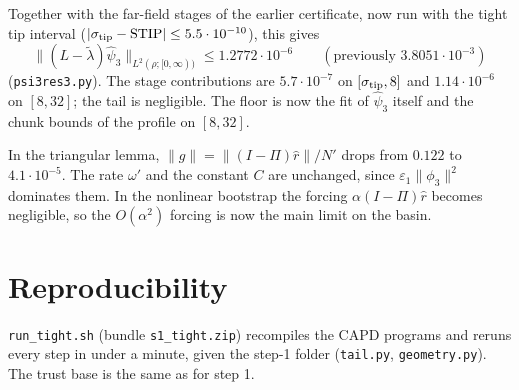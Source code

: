 \documentclass[11pt]{amsart}
\theoremstyle{remark}
\newcommand{\eps}{\varepsilon}
\begin{document}
Together with the far-field stages of the earlier certificate, now run with the tight tip interval ($|\sigma_{\rm tip}-\mathrm{STIP}|\le5.5\cdot10^{-10}$), this gives
\[
\|(L-\tilde\lambda)\hat\psi_3\|_{L^2(\rho;[0,\infty))}\le1.2772\cdot10^{-6}\qquad(\text{previously }3.8051\cdot10^{-3})
\]
(\texttt{psi3res3.py}). The stage contributions are $5.7\cdot10^{-7}$ on $[\sigma_{\rm tip},8]$ and $1.14\cdot10^{-6}$ on $[8,32]$; the tail is negligible. The floor is now the fit of $\hat\psi_3$ itself and the chunk bounds of the profile on $[8,32]$.

In the triangular lemma, $\|g\|=\|(I-\Pi)\hat r\|/N'$ drops from $0.122$ to $4.1\cdot10^{-5}$. The rate $\omega'$ and the constant $C$ are unchanged, since $\eps_1\|\phi_3\|^2$ dominates them. In the nonlinear bootstrap the forcing $\alpha(I-\Pi)\hat r$ becomes negligible, so the $O(\alpha^2)$ forcing is now the main limit on the basin.

\section*{Reproducibility}
\texttt{run\_tight.sh} (bundle \texttt{s1\_tight.zip}) recompiles the CAPD programs and reruns every step in under a minute, given the step-1 folder (\texttt{tail.py}, \texttt{geometry.py}). The trust base is the same as for step 1.
\end{document}
